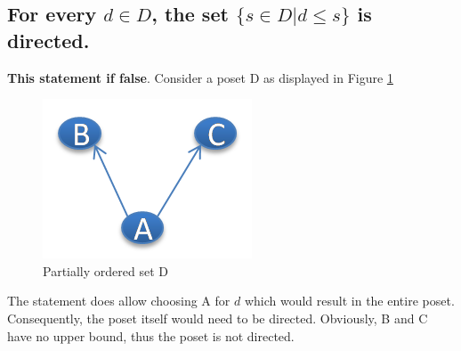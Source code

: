 \subsection{For every $d \in D$, the set $\{s \in D | d \leq s\}$ is directed.}
\textbf{This statement if false}. Consider a poset D as displayed in Figure \ref{img:ex1d:posetD}
\begin{figure}[htbp]
  \begin{center}
    \includegraphics{exercises/figures/exercise1d-poset-D.png}
    \caption{Partially ordered set D}
    \label{img:ex1d:posetD}
  \end{center}
\end{figure}
The statement does allow choosing A for $d$ which would result in the entire poset. Consequently, the poset itself would need to be directed. Obviously, B and C have no upper bound, thus the poset is not directed.